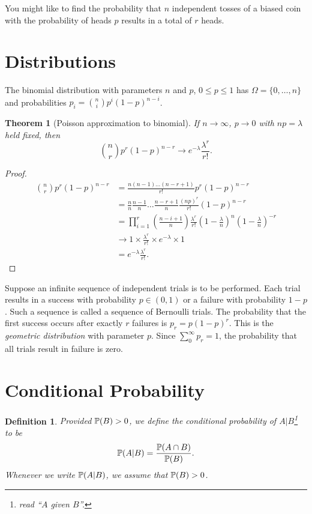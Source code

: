\documentclass{notes}
\theoremstyle{plain}
\newtheorem{theorem}{Theorem}[chapter]
\newtheorem{definition}{Definition}[chapter]
\newcommand{\bP}{\mathbb{P}}
\newcommand{\prob}[1]{\bP \negthinspace\left(#1\right)}
\begin{document}
You might like to find the probability that $n$ independent tosses of a biased
coin with the probability of heads $p$ results in a total of $r$ heads.

\section{Distributions}

The binomial distribution with parameters $n$ and $p$, $0 \le p \le 1$ has 
$\Omega = \{ 0, \dots, n \}$ and probabilities
$p_i = \binom{n}{i} p^i (1-p)^{n-i}$.

\begin{theorem}[Poisson approximation to binomial]
If $n \rightarrow \infty$, $p \rightarrow 0$ with $n p = \lambda$ held fixed,
then
\[
\binom{n}{r} p^r (1-p)^{n-r} \rightarrow e^{- \lambda} \frac{\lambda^r}{r!}.
\]
\end{theorem}

\begin{proof}
\begin{align*}
\binom{n}{r} p^r (1-p)^{n-r} &= \frac{n (n-1) \dots (n-r+1)}{r!}
p^r (1-p)^{n-r} \\
&= \frac{n}{n} \frac{n-1}{n} \dots \frac{n-r+1}{n} \frac{ (np)^r}{r!}
 (1-p)^{n-r} \\
&= \prod_{i=1}^r \left( \frac{n - i + 1}{n} \right)
\frac{\lambda^r}{r!} \left(1 - \frac{\lambda}{n} \right)^n
\left(1 - \frac{\lambda}{n} \right)^{-r} \\
& \rightarrow 1 \times \frac{\lambda^r}{r!} \times e^{-\lambda} \times 1 \\
& = e^{-\lambda} \frac{\lambda^r}{r!}.
\end{align*}
\end{proof}

Suppose an infinite sequence of independent trials is to be performed.  Each
trial results in a success with probability $p \in (0,1)$ or a failure with
probability $1-p$.  Such a sequence is called a sequence of Bernoulli trials.
The probability that the first success occurs after exactly $r$ failures is
$p_r = p (1-p)^r$.  This is the \emph{geometric distribution} with parameter
$p$.  Since $\sum_0^\infty p_r = 1$, the probability that all
trials result in failure is zero.

\section{Conditional Probability}

\begin{definition}
Provided $\prob{B} > 0$, we define the conditional probability of
$A | B$\footnote{read ``$A$ given $B$''.} to be
\[
\prob{A | B} = \frac{\prob{A \cap B}}{\prob{B}}.
\]
Whenever we write $\prob{A | B}$, we assume that $\prob{B} > 0$.
\end{definition}
\end{document}
